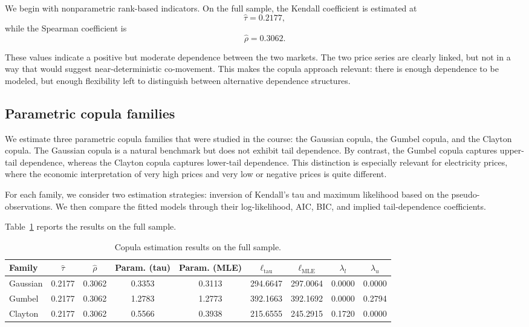 We begin with nonparametric rank-based indicators. On the full sample, the Kendall coefficient is estimated at
\[
\hat\tau = 0.2177,
\]
while the Spearman coefficient is
\[
\hat\rho = 0.3062.
\]

These values indicate a positive but moderate dependence between the two markets. The two price series are clearly linked, but not in a way that would suggest near-deterministic co-movement. This makes the copula approach relevant: there is enough dependence to be modeled, but enough flexibility left to distinguish between alternative dependence structures.

\subsection{Parametric copula families}

We estimate three parametric copula families that were studied in the course: the Gaussian copula, the Gumbel copula, and the Clayton copula. The Gaussian copula is a natural benchmark but does not exhibit tail dependence. By contrast, the Gumbel copula captures upper-tail dependence, whereas the Clayton copula captures lower-tail dependence. This distinction is especially relevant for electricity prices, where the economic interpretation of very high prices and very low or negative prices is quite different.

For each family, we consider two estimation strategies: inversion of Kendall's tau and maximum likelihood based on the pseudo-observations. We then compare the fitted models through their log-likelihood, AIC, BIC, and implied tail-dependence coefficients.

Table~\ref{tab:copula_full} reports the results on the full sample.

\begin{table}[H]
\centering
\caption{Copula estimation results on the full sample.}
\label{tab:copula_full}
\begin{tabular}{lcccccccc}
\toprule
Family & \(\hat\tau\) & \(\hat\rho\) & Param. (tau) & Param. (MLE) & \(\ell_{\text{tau}}\) & \(\ell_{\text{MLE}}\) & \(\lambda_l\) & \(\lambda_u\) \\
\midrule
Gaussian & 0.2177 & 0.3062 & 0.3353 & 0.3113 & 294.6647 & 297.0064 & 0.0000 & 0.0000 \\
Gumbel   & 0.2177 & 0.3062 & 1.2783 & 1.2773 & 392.1663 & 392.1692 & 0.0000 & 0.2794 \\
Clayton  & 0.2177 & 0.3062 & 0.5566 & 0.3938 & 215.6555 & 245.2915 & 0.1720 & 0.0000 \\
\bottomrule
\end{tabular}
\end{table}

